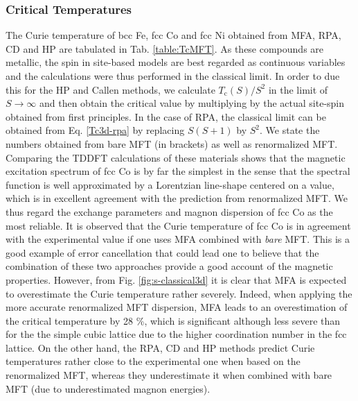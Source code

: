 \documentclass[aps,prb,reprint,floatfix,superscriptaddress]{revtex4-2}
\begin{document}
\subsubsection{Critical Temperatures}
The Curie temperature of bcc Fe, fcc Co and fcc Ni obtained from MFA, RPA, CD and HP are tabulated in Tab. \ref{table:TcMFT}. 
As these compounds are metallic, the spin in site-based models are best regarded as continuous variables and the calculations were thus performed in the classical limit. In order to due this for the HP and Callen methods, we calculate $T_\mathrm{c}(S)/S^2$ in the limit of $S\rightarrow\infty$ and then obtain the critical value by multiplying by the actual site-spin obtained from first principles. In the case of RPA, the classical limit can be obtained from Eq. \eqref{Tc3d-rpa} by replacing $S(S+1)$ by $S^2$. We state the numbers obtained from bare MFT (in brackets) as well as renormalized MFT. Comparing the TDDFT calculations of these materials \cite{Skovhus2021} shows that the magnetic excitation spectrum of fcc Co is by far the simplest in the sense that the spectral function is well approximated by a Lorentzian line-shape centered on a value, which is in excellent agreement with the prediction from renormalized MFT. We thus regard the exchange parameters and magnon dispersion of fcc Co as the most reliable. It is observed that the Curie temperature of fcc Co is in agreement with the experimental value if one uses MFA combined with {\it bare} MFT. This is a good example of error cancellation that could lead one to believe that the combination of these two approaches provide a good account of the magnetic properties. However, from Fig. \ref{fig:s-classical3d} it is clear that MFA is expected to overestimate the Curie temperature rather severely. Indeed, when applying the more accurate renormalized MFT dispersion, MFA leads to an overestimation of the critical temperature by 28 \%, which is significant although less severe than for the the simple cubic lattice due to the higher coordination number in the fcc lattice. On the other hand, the RPA, CD and HP methods predict Curie temperatures rather close to the experimental one when based on the renormalized MFT, whereas they underestimate it when combined with bare MFT (due to underestimated magnon energies). 
\end{document}
